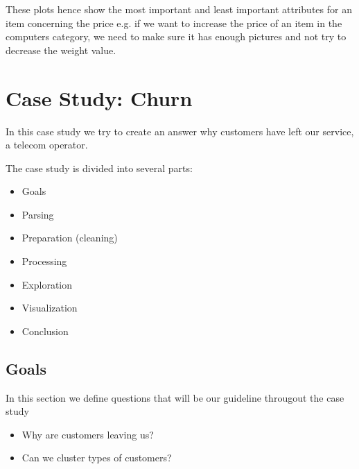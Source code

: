 \documentclass[letterpaper,10pt,english]{jupyterBook}
\begin{document}
\sphinxAtStartPar
These plots hence show the most important and least important attributes for an item concerning the price e.g. if we want to increase the price of an item in the computers category, we need to make sure it has enough pictures and not try to decrease the weight value.


\chapter{Case Study: Churn}
\label{\detokenize{c7_case_studies/Churn:case-study-churn}}\label{\detokenize{c7_case_studies/Churn::doc}}
\sphinxAtStartPar
In this case study we try to create an answer why customers have left our service, a telecom operator.

\sphinxAtStartPar
The case study is divided into several parts:
\begin{itemize}
\item {} 
\sphinxAtStartPar
Goals

\item {} 
\sphinxAtStartPar
Parsing

\item {} 
\sphinxAtStartPar
Preparation (cleaning)

\item {} 
\sphinxAtStartPar
Processing

\item {} 
\sphinxAtStartPar
Exploration

\item {} 
\sphinxAtStartPar
Visualization

\item {} 
\sphinxAtStartPar
Conclusion

\end{itemize}


\section{Goals}
\label{\detokenize{c7_case_studies/Churn:goals}}
\sphinxAtStartPar
In this section we define questions that will be our guideline througout the case study
\begin{itemize}
\item {} 
\sphinxAtStartPar
Why are customers leaving us?

\item {} 
\sphinxAtStartPar
Can we cluster types of customers?

\end{itemize}
\end{document}
